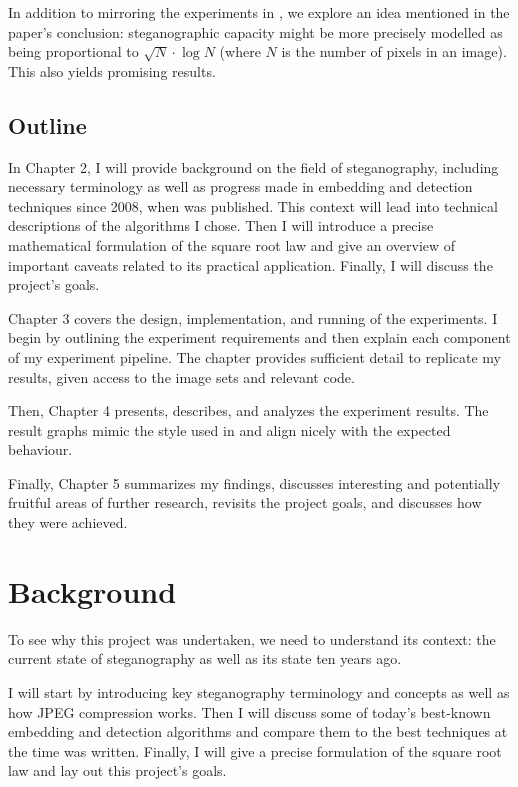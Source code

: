 \documentclass[11pt,a4paper,twoside,openright]{report}
\begin{document}
In addition to mirroring the experiments in \cite{2008-paper}, we explore an idea mentioned in the paper's conclusion: steganographic capacity might be more precisely modelled as being proportional to $\sqrt{N} \cdot \log{N}$ (where $N$ is the number of pixels in an image). This also yields promising results.


\section{Outline}

In Chapter 2, I will provide background on the field of steganography, including necessary terminology as well as  progress made in embedding and detection techniques since 2008, when \cite{2008-paper} was published. This context will lead into technical descriptions of the algorithms I chose. Then I will introduce a precise mathematical formulation of the square root law and give an overview of important caveats related to its practical application. Finally, I will discuss the project's goals.

Chapter 3 covers the design, implementation, and running of the experiments. I begin by outlining the experiment requirements and then explain each component of my experiment pipeline. The chapter provides sufficient detail to replicate my results, given access to the image sets and relevant code.

Then, Chapter 4 presents, describes, and analyzes the experiment results. The result graphs mimic the style used in \cite{2008-paper} and align nicely with the expected behaviour.

Finally, Chapter 5 summarizes my findings, discusses interesting and potentially fruitful areas of further research, revisits the project goals, and discusses how they were achieved.


\chapter{Background}

To see why this project was undertaken, we need to understand its context: the current state of steganography as well as its state ten years ago.

I will start by introducing key steganography terminology and concepts as well as how JPEG compression works. Then I will discuss some of today's best-known embedding and detection algorithms and compare them to the best techniques at the time \cite{2008-paper} was written. Finally, I will give a precise formulation of the square root law and lay out this project's goals.
\end{document}
